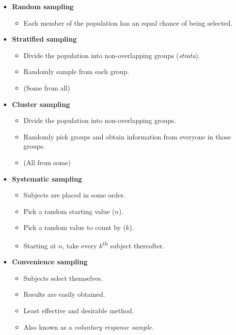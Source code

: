 \documentclass{article}
\begin{document}
\begin{itemize}
	\item \textbf{Random sampling}
	\begin{itemize}
		\item Each member of the population has an equal chance of being selected.
	\end{itemize}	\vspace{10pt}
	\item \textbf{Stratified sampling}
	\begin{itemize}
		\item Divide the population into non-overlapping groups (\textit{strata}).
		\item Randomly sample from each group.
		\item (Some from all)
	\end{itemize}
\end{itemize}


\begin{itemize}
	\item \textbf{Cluster sampling}
	\begin{itemize}
		\item Divide the population into non-overlapping groups.
		\item Randomly pick groups and obtain information from everyone in those groups.
		\item (All from some)
	\end{itemize}	\vspace{10pt}
	\item \textbf{Systematic sampling}
	\begin{itemize}
		\item Subjects are placed in some order.
		\item Pick a random starting value ($n$).
		\item Pick a random value to count by ($k$).
		\item Starting at $n$, take every $k$\textsuperscript{th} subject thereafter.
	\end{itemize}
\end{itemize}

\begin{itemize}
	\item \textbf{Convenience sampling}
	\begin{itemize}
		\item Subjects select themselves.
		\item Results are easily obtained.
		\item Least effective and desirable method.
		\item Also known as a \textit{voluntary response sample}.
	\end{itemize}
\end{itemize}
\end{document}
